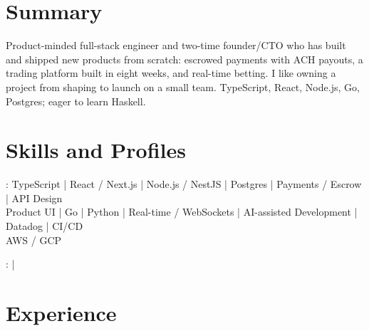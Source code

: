 \documentclass[print]{jack-resume}
\begin{document}
\pagecolor{darkmodeBackground}


\begin{minipage}[t][1cm][t]{.03\textwidth}
    \hfill
\end{minipage}

\section{Summary}
Product-minded full-stack engineer and two-time founder/CTO who has built and shipped new products from scratch: escrowed payments with ACH payouts, a trading platform built in eight weeks, and real-time betting. I like owning a project from shaping to launch on a small team. TypeScript, React, Node.js, Go, Postgres; eager to learn Haskell.
\sectionsep

\section{Skills and Profiles}
:
TypeScript \hfill | \hfill
React / Next.js \hfill | \hfill
Node.js / NestJS \hfill | \hfill
Postgres \hfill | \hfill
Payments / Escrow \hfill | \hfill
API Design \\
\hspace{1.0cm} Product UI \hfill | \hfill
Go \hfill | \hfill
Python \hfill | \hfill
Real-time / WebSockets \hfill | \hfill
AI-assisted Development \hfill | \hfill
Datadog \hfill | \hfill
CI/CD \\
\hspace{1.0cm} AWS / GCP \\

\raggedright{
    :
      \href{https://www.linkedin.com/in/jack-sturtevant/}{ \ExternalLink} |
     \href{https://github.com/jacksturt}{ \ExternalLink}}

\section{Experience}
\end{document}

